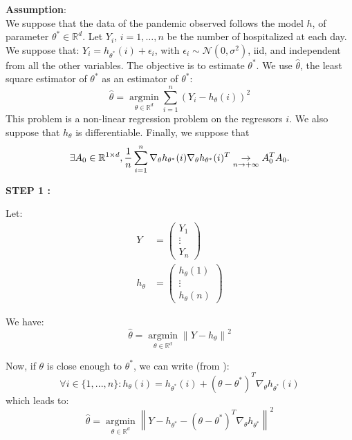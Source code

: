 \textbf{Assumption}:
\\[0.5cm]
We suppose that the data of the pandemic observed follows the model $h$, of parameter $\theta^* \in \mathbb{R}^d$. Let $Y_i$, $ i = 1, \ldots, n$ be the number of hospitalized at each day. We suppose that: $Y_i = h_{\theta ^* } (i) + \epsilon_i$, with $\epsilon_i \sim \mathcal{N}(0, \sigma^2)$, iid, and independent from all the other variables. The objective is to estimate $\theta^*$. We use $\hat{\theta}$, the least square estimator of $\theta^*$ as an estimator of $\theta^* $:
\[
\hat{\theta} =  \underset{\theta \in \mathbb{R}^d}{\operatorname{argmin}} \sum_{i=1}^{n} (Y_i - h_{\theta}(i))^2
\]
This problem is a non-linear regression problem on the regressors $i$. 
We also suppose that $h_\theta$ is differentiable.
Finally, we suppose that 
\begin{equation}
\exists A_0 \in \mathbb{R} ^{1 \times d},  \frac{1}{n} \sum_{i=1}^{n} \nabla_\theta h_{\theta^*}(i) \nabla_\theta h_{\theta^*}(i)^T \underset{n \rightarrow +\infty }{\rightarrow}  A_0^T A_0 .\label{hyp:major}  \\
\end{equation}

\textbf{STEP 1 :}\\
\label{step:step1}

Let:
\begin{align*}
Y &= \begin{pmatrix}
Y_1 \\
\vdots \\
Y_n
\end{pmatrix} \\
h_\theta &= \begin{pmatrix}
h_\theta(1) \\
\vdots \\
h_\theta(n)
\end{pmatrix}
\end{align*}

We have:
\[
\hat{\theta} =  \underset{\theta \in \mathbb{R}^d}{\operatorname{argmin}}  \left\lVert Y - h_\theta \right\rVert ^2
\]

Now, if $\theta$ is close enough to $\theta^*$, we can write (from \cite{ruckstuhl2010introduction}):
\[
\forall i \in \{ 1, ..., n\} :  h_\theta(i) = h_{\theta^*} (i ) + (\theta - \theta^*)^T\nabla_\theta h_{\theta^*}(i) 
\]
which leads to:
\[
\hat{\theta} =  \underset{\theta \in \mathbb{R}^d}{\operatorname{argmin}}  \left\lVert Y - h_{\theta^*}  - (\theta - \theta^*)^T\nabla_\theta h_{\theta^*}\right\rVert ^2
\]

